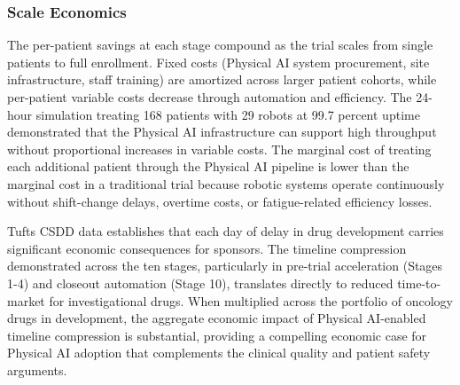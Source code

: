 \subsubsection{Scale Economics}

The per-patient savings at each stage compound as the trial scales from single
patients to full enrollment. Fixed costs (Physical AI system procurement, site
infrastructure, staff training) are amortized across larger patient cohorts,
while per-patient variable costs decrease through automation and efficiency.
The 24-hour simulation treating 168 patients with 29 robots at 99.7 percent
uptime demonstrated that the Physical AI infrastructure can support high
throughput without proportional increases in variable costs. The marginal cost
of treating each additional patient through the Physical AI pipeline is lower
than the marginal cost in a traditional trial because robotic systems operate
continuously without shift-change delays, overtime costs, or fatigue-related
efficiency losses.

Tufts CSDD data \cite{tufts-delay} establishes that each day of delay in drug
development carries significant economic consequences for sponsors. The
timeline compression demonstrated across the ten stages, particularly in
pre-trial acceleration (Stages 1-4) and closeout automation (Stage 10),
translates directly to reduced time-to-market for investigational drugs. When
multiplied across the portfolio of oncology drugs in development, the
aggregate economic impact of Physical AI-enabled timeline compression is
substantial, providing a compelling economic case for Physical AI adoption
that complements the clinical quality and patient safety arguments.
